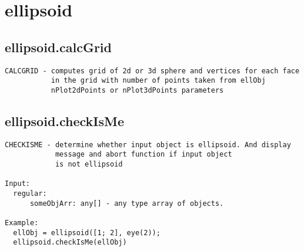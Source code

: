 \section{ellipsoid}\label{secClassDescr:ellipsoid}
\subsection{\texorpdfstring{ellipsoid.calcGrid}{calcGrid}}\label{method:ellipsoid.calcGrid}
\begin{verbatim}
CALCGRID - computes grid of 2d or 3d sphere and vertices for each face
           in the grid with number of points taken from ellObj
           nPlot2dPoints or nPlot3dPoints parameters
\end{verbatim}
\subsection{\texorpdfstring{ellipsoid.checkIsMe}{checkIsMe}}\label{method:ellipsoid.checkIsMe}
\begin{verbatim}
CHECKISME - determine whether input object is ellipsoid. And display
            message and abort function if input object
            is not ellipsoid

Input:
  regular:
      someObjArr: any[] - any type array of objects.

Example:
  ellObj = ellipsoid([1; 2], eye(2));
  ellipsoid.checkIsMe(ellObj)
\end{verbatim}
